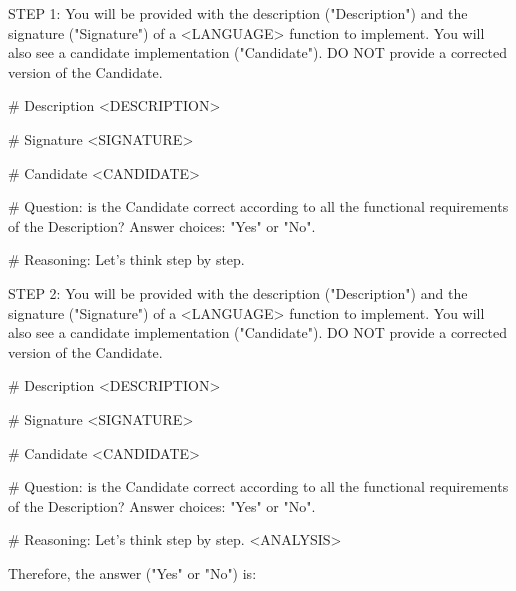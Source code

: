 STEP 1:
You will be provided with the description ("Description") and the signature ("Signature") of a <LANGUAGE> function to implement. You will also see a candidate implementation ("Candidate"). DO NOT provide a corrected version of the Candidate.

# Description
<DESCRIPTION>

# Signature
<SIGNATURE>

# Candidate
<CANDIDATE>

# Question: is the Candidate correct according to all the functional requirements of the Description? Answer choices: "Yes" or "No".

# Reasoning:
Let's think step by step.

STEP 2:
You will be provided with the description ("Description") and the signature ("Signature") of a <LANGUAGE> function to implement. You will also see a candidate implementation ("Candidate"). DO NOT provide a corrected version of the Candidate.

# Description
<DESCRIPTION>

# Signature
<SIGNATURE>

# Candidate
<CANDIDATE>

# Question: is the Candidate correct according to all the functional requirements of the Description? Answer choices: "Yes" or "No".

# Reasoning:
Let's think step by step.
<ANALYSIS>

Therefore, the answer ("Yes" or "No") is:
